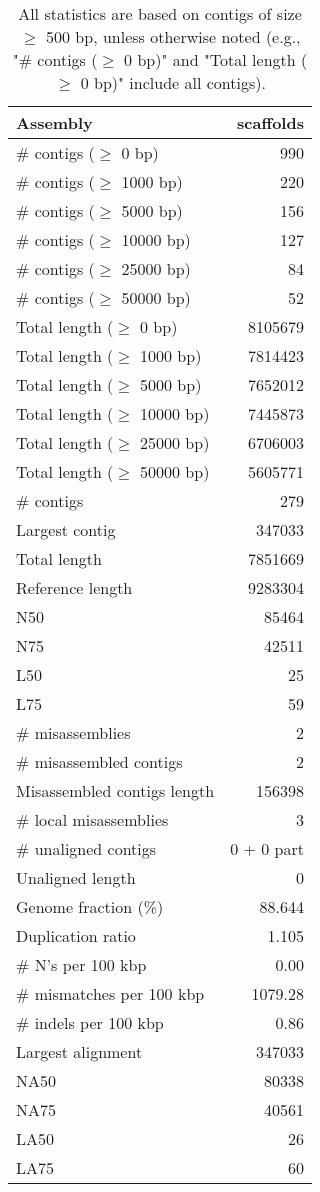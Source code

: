 \documentclass[12pt,a4paper]{article}
\begin{document}
\begin{table}[ht]
\begin{center}
\caption{All statistics are based on contigs of size $\geq$ 500 bp, unless otherwise noted (e.g., "\# contigs ($\geq$ 0 bp)" and "Total length ($\geq$ 0 bp)" include all contigs).}
\begin{tabular}{|l*{1}{|r}|}
\hline
Assembly & scaffolds \\ \hline
\# contigs ($\geq$ 0 bp) & 990 \\ \hline
\# contigs ($\geq$ 1000 bp) & 220 \\ \hline
\# contigs ($\geq$ 5000 bp) & 156 \\ \hline
\# contigs ($\geq$ 10000 bp) & 127 \\ \hline
\# contigs ($\geq$ 25000 bp) & 84 \\ \hline
\# contigs ($\geq$ 50000 bp) & 52 \\ \hline
Total length ($\geq$ 0 bp) & 8105679 \\ \hline
Total length ($\geq$ 1000 bp) & 7814423 \\ \hline
Total length ($\geq$ 5000 bp) & 7652012 \\ \hline
Total length ($\geq$ 10000 bp) & 7445873 \\ \hline
Total length ($\geq$ 25000 bp) & 6706003 \\ \hline
Total length ($\geq$ 50000 bp) & 5605771 \\ \hline
\# contigs & 279 \\ \hline
Largest contig & 347033 \\ \hline
Total length & 7851669 \\ \hline
Reference length & 9283304 \\ \hline
N50 & 85464 \\ \hline
N75 & 42511 \\ \hline
L50 & 25 \\ \hline
L75 & 59 \\ \hline
\# misassemblies & 2 \\ \hline
\# misassembled contigs & 2 \\ \hline
Misassembled contigs length & 156398 \\ \hline
\# local misassemblies & 3 \\ \hline
\# unaligned contigs & 0 + 0 part \\ \hline
Unaligned length & 0 \\ \hline
Genome fraction (\%) & 88.644 \\ \hline
Duplication ratio & 1.105 \\ \hline
\# N's per 100 kbp & 0.00 \\ \hline
\# mismatches per 100 kbp & 1079.28 \\ \hline
\# indels per 100 kbp & 0.86 \\ \hline
Largest alignment & 347033 \\ \hline
NA50 & 80338 \\ \hline
NA75 & 40561 \\ \hline
LA50 & 26 \\ \hline
LA75 & 60 \\ \hline
\end{tabular}
\end{center}
\end{table}
\end{document}
